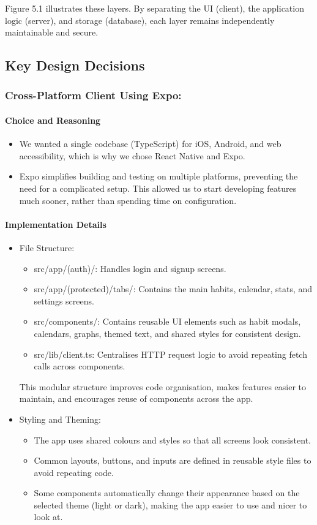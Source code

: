 Figure 5.1 illustrates these layers. By separating the UI (client), the application logic (server), and storage (database), each layer remains independently maintainable and secure.

\subsection{Key Design Decisions}

\subsubsection{Cross-Platform Client Using Expo:}

\paragraph{Choice and Reasoning} \begin{itemize} \item We wanted a single codebase (TypeScript) for iOS, Android, and web accessibility, which is why we chose React Native and Expo.
\item Expo simplifies building and testing on multiple platforms, preventing the need for a complicated setup. This allowed us to start developing features much sooner, rather than spending time on configuration.  \end{itemize}

\paragraph{Implementation Details} \begin{itemize} \item {File Structure}:
\begin{itemize} \item {src/app/(auth)/}: Handles login and signup screens.
\item{src/app/(protected)/tabs/}: Contains the main habits, calendar, stats, and settings screens.
\item{src/components/}: Contains reusable UI elements such as habit modals, calendars, graphs, themed text, and shared styles for consistent design.
\item {src/lib/client.ts}: Centralises HTTP request logic to avoid repeating fetch calls across components. \end{itemize} 
This modular structure improves code organisation, makes features easier to maintain, and encourages reuse of components across the app.
\item {Styling and Theming}:
\begin{itemize} 
\item The app uses shared colours and styles so that all screens look consistent.
\item Common layouts, buttons, and inputs are defined in reusable style files to avoid repeating code.
\item Some components automatically change their appearance based on the selected theme (light or dark), making the app easier to use and nicer to look at. \end{itemize} \end{itemize}


